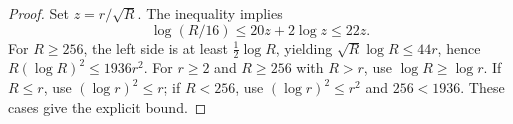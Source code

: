 \begin{proof}
Set $z=r/\sqrt R$. The inequality implies
\[
 \log(R/16)\le20z+2\log z\le22z.
\]
For $R\ge256$, the left side is at least $\tfrac12\log R$, yielding
$\sqrt R\log R\le44r$, hence $R(\log R)^2\le1936r^2$.
For $r\ge2$ and $R\ge256$ with $R>r$, use $\log R\ge\log r$.
If $R\le r$, use $(\log r)^2\le r$; if $R<256$, use
$(\log r)^2\le r^2$ and $256<1936$. These cases give the explicit bound.
\end{proof}

